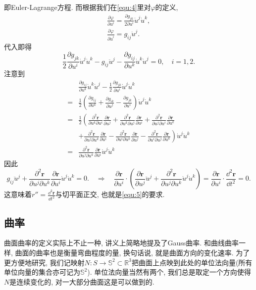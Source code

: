 \documentclass[./main.tex]{subfiles}
\begin{document}
即Euler-Lagrange方程. 而根据我们在\eqref{equ:4}里对\(\varphi\)的定义,
\begin{gather*}
    \frac{\partial\varphi}{\partial u^i}=\frac{\partial g_{jk}}{2\partial u^i}\dot u^j\dot u^k,\\
    \frac{\partial\varphi}{\partial\dot u^i}=g_{ij}\dot u^j.
\end{gather*}
代入即得
\[
    \frac12\frac{\partial g_{jk}}{\partial u^i}\dot u^j\dot u^k-g_{ij}\ddot u^j-\frac{\partial g_{ij}}{\partial u^k}\dot u^k\dot u^j=0,\quad i=1,2.
\]
注意到
\begin{align*}
    &\frac{\partial g_{ij}}{\partial u^k}\dot u^k\dot u^j-\frac12\frac{\partial g_{jk}}{\partial u^i}\dot u^j\dot u^k\\
    =&\frac{1}{2}\left(\frac{\partial g_{ij}}{\partial u^k}+\frac{\partial g_{ik}}{\partial u^j}-\frac{\partial g_{jk}}{\partial u^i}\right)\dot u^j\dot u^k\\
    =&\frac{1}{2}\left(\frac{\partial^2\mathbf{r}}{\partial u^k\partial u^i}\frac{\partial\mathbf{r}}{\partial u^j}+\frac{\partial^2\mathbf{r}}{\partial u^k\partial u^j}\frac{\partial\mathbf{r}}{\partial u^i}+\frac{\partial^2\mathbf{r}}{\partial u^j\partial u^i}\frac{\partial\mathbf{r}}{\partial u^k}\right.\\
     &+\left.\frac{\partial^2\mathbf{r}}{\partial u^j\partial u^k}\frac{\partial\mathbf{r}}{\partial u^i}-\frac{\partial^2\mathbf{r}}{\partial u^i\partial u^k}\frac{\partial\mathbf{r}}{\partial u^j}-\frac{\partial^2\mathbf{r}}{\partial u^i\partial u^j}\frac{\partial\mathbf{r}}{\partial u^k}\right)\dot u^j\dot u^k\\
    =&\frac{\partial^2\mathbf{r}}{\partial u^j\partial u^k}\frac{\partial\mathbf{r}}{\partial u^i}\dot u^j\dot u^k
\end{align*}
因此
\[
    g_{ij}\ddot u^j+\frac{\partial^2\mathbf{r}}{\partial u^j\partial u^k}\frac{\partial\mathbf{r}}{\partial u^i}\dot u^j\dot u^k=0.\quad \Longrightarrow\quad\frac{\partial\mathbf{r}}{\partial u^i}\cdot\left(\frac{\partial\mathbf{r}}{\partial u^j}\ddot u^j+\frac{\partial^2\mathbf{r}}{\partial u^j\partial u^k}\dot u^j\dot u^k\right)=\frac{\partial\mathbf{r}}{\partial u^i}\cdot\frac{\dd^2\mathbf{r}}{\dd t^2}=0.
\]
这意味着\(r''=\frac{\dd^2\mathbf{r}}{\dd t^2}\)与切平面正交, 也就是\eqref{equ:5}的要求.
\subsection{曲率}
曲面曲率的定义实际上不止一种, 讲义上简略地提及了Gauss曲率. 和曲线曲率一样, 曲面的曲率也是衡量弯曲程度的量, 换句话说, 就是曲面方向的变化速率. 为了更方便地研究, 我们记映射\(N:S\to\mathbb{S}^2\subset\mathbb{R}^3\)把曲面上点映到此处的单位法向量(所有单位向量的集合亦可记为\(\mathbb{S}^2\)). 单位法向量当然有两个, 我们总是取定一个方向使得\(N\)是连续变化的, 对一大部分曲面这是可以做到的. 
\end{document}
